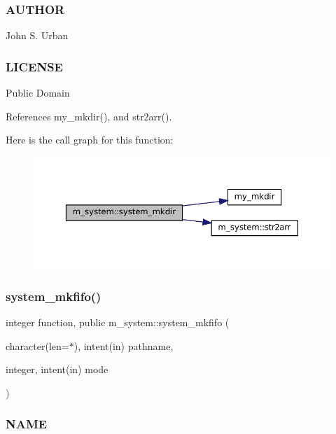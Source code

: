 \subsubsection*{A\+U\+T\+H\+OR}

John S. Urban \subsubsection*{L\+I\+C\+E\+N\+SE}

Public Domain 

References my\+\_\+mkdir(), and str2arr().

Here is the call graph for this function\+:
\nopagebreak
\begin{figure}[H]
\begin{center}
\leavevmode
\includegraphics[width=350pt]{namespacem__system_a084d644c236d22af2cc75c6e48fd6e96_cgraph}
\end{center}
\end{figure}
\mbox{\label{namespacem__system_ab2d95258ee26b85a0283538880775475}} 
\subsubsection{\texorpdfstring{system\+\_\+mkfifo()}{system\_mkfifo()}}
{\footnotesize\ttfamily integer function, public m\+\_\+system\+::system\+\_\+mkfifo (\begin{DoxyParamCaption}\item[{character(len=$\ast$), intent(in)}]{pathname,  }\item[{integer, intent(in)}]{mode }\end{DoxyParamCaption})}



\subsubsection*{N\+A\+ME}

